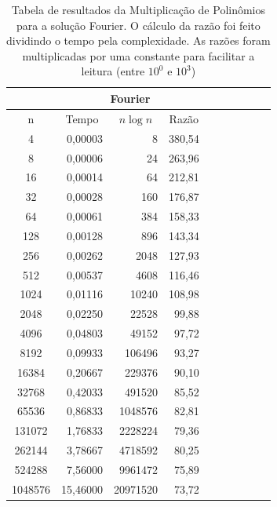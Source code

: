 \documentclass[
	12pt,				%
	oneside,			%
	a4paper,			%
	english,			%
	french,				%
	spanish,			%
	brazil,				%
	]{abntex2}
\begin{document}
\begin{table}[H]
  \centering    
  \begin{tabular}{|c|r|r|r|r|r|r|r|r|r|}
    \toprule
    \multicolumn{1}{|c|}{\cellcolor{gray!25}\textbf{}} &
    \multicolumn{3}{|c|}{\cellcolor{gray!25}\textbf{Fourier}} \\
    \midrule
    \multicolumn{1}{|c|}{\cellcolor{gray!10}n} &
    \multicolumn{1}{|c|}{\cellcolor{gray!10}Tempo} &
    \multicolumn{1}{|c|}{\cellcolor{gray!10}$n\log{n}$} &
    \multicolumn{1}{|c|}{\cellcolor{gray!10}Razão} \\
    4	&	0,00003	&	8	&	380,54	 \\ \hline
    8	&	0,00006	&	24	&	263,96	 \\ \hline
    16	&	0,00014	&	64	&	212,81	 \\ \hline
    32	&	0,00028	&	160	&	176,87	 \\ \hline
    64	&	0,00061	&	384	&	158,33	 \\ \hline
    128	&	0,00128	&	896	&	143,34	 \\ \hline
    256	&	0,00262	&	2048	&	127,93	 \\ \hline
    512	&	0,00537	&	4608	&	116,46	 \\ \hline
    1024	&	0,01116	&	10240	&	108,98	 \\ \hline
    2048	&	0,02250	&	22528	&	99,88	 \\ \hline
    4096	&	0,04803	&	49152	&	97,72	 \\ \hline
    8192	&	0,09933	&	106496	&	93,27	 \\ \hline
    16384	&	0,20667	&	229376	&	90,10	 \\ \hline
    32768	&	0,42033	&	491520	&	85,52	 \\ \hline
    65536	&	0,86833	&	1048576	&	82,81	 \\ \hline
    131072	&	1,76833	&	2228224	&	79,36	 \\ \hline
    262144	&	3,78667	&	4718592	&	80,25	 \\ \hline
    524288	&	7,56000	&	9961472	&	75,89	 \\ \hline
    1048576	&	15,46000	&	20971520	&	73,72	 \\ \hline
  \end{tabular}
  \caption{Tabela de resultados da Multiplicação de Polinômios para a solução Fourier. O cálculo da razão foi feito dividindo o tempo pela complexidade. As razões foram multiplicadas por uma constante para facilitar a leitura (entre $10^0$ e $10^3$)}
  \label{tab:polymul}
\end{table}
\end{document}
